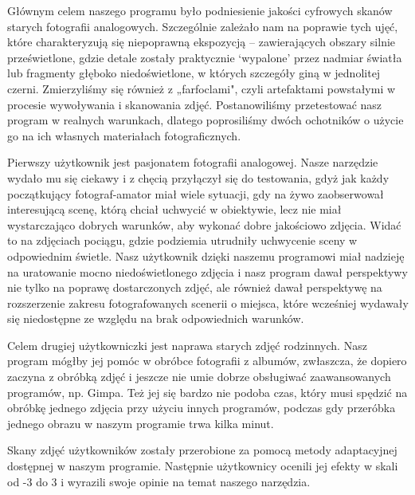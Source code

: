 \documentclass[]{mwart}
\begin{document}
Głównym celem naszego programu było podniesienie jakości cyfrowych skanów starych fotografii analogowych. Szczególnie zależało nam na poprawie tych ujęć, które charakteryzują się niepoprawną ekspozycją -- zawierających obszary silnie prześwietlone, gdzie detale zostały praktycznie `wypalone' przez nadmiar światła lub fragmenty głęboko niedoświetlone, w których szczegóły giną w jednolitej czerni. Zmierzyliśmy się również z „farfoclami", czyli artefaktami powstałymi w procesie wywoływania i skanowania zdjęć. Postanowiliśmy przetestować nasz program w realnych warunkach, dlatego poprosiliśmy dwóch ochotników o użycie go na ich własnych materiałach fotograficznych. \newline

Pierwszy użytkownik jest pasjonatem fotografii analogowej. Nasze narzędzie wydało mu się ciekawy i z chęcią przyłączył się do testowania, gdyż jak każdy początkujący fotograf-amator miał wiele sytuacji, gdy na żywo zaobserwował interesującą scenę, którą chciał uchwycić w obiektywie, lecz nie miał wystarczająco dobrych warunków, aby wykonać dobre jakościowo zdjęcia. Widać to na zdjęciach pociągu, gdzie podziemia utrudniły uchwycenie sceny w odpowiednim świetle. Nasz użytkownik dzięki naszemu programowi miał nadzieję na uratowanie mocno niedoświetlonego zdjęcia i nasz program dawał perspektywy nie tylko na poprawę dostarczonych zdjęć, ale również dawał perspektywę na rozszerzenie zakresu fotografowanych scenerii o miejsca, które wcześniej wydawały się niedostępne ze względu na brak odpowiednich warunków. \newline

Celem drugiej użytkowniczki jest naprawa starych zdjęć rodzinnych. Nasz program mógłby jej pomóc w obróbce fotografii z albumów, zwłaszcza, że dopiero zaczyna z obróbką zdjęć i jeszcze nie umie dobrze obsługiwać zaawansowanych programów, np. Gimpa. Też jej się bardzo nie podoba czas, który musi spędzić na obróbkę jednego zdjęcia przy użyciu innych programów, podczas gdy przeróbka jednego obrazu w naszym programie trwa kilka minut. \newline

Skany zdjęć użytkowników zostały przerobione za pomocą metody adaptacyjnej dostępnej w naszym programie. Następnie użytkownicy ocenili jej efekty w skali od -3 do 3 i wyrazili swoje opinie na temat naszego narzędzia.


\end{document}
